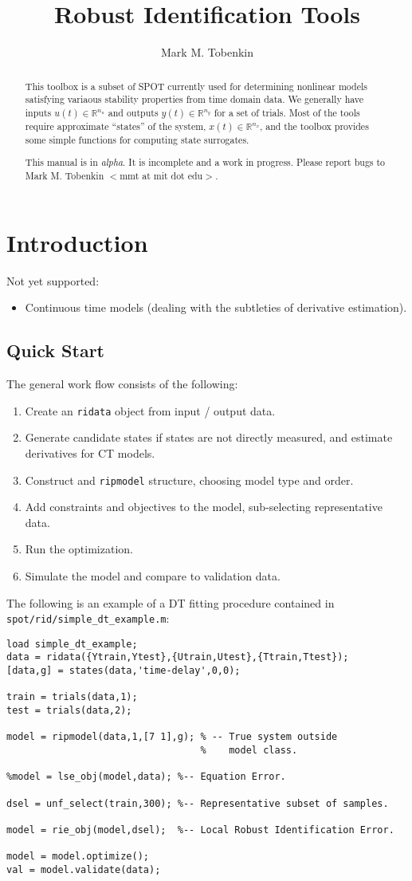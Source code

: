 \documentclass{article}
\title{Robust Identification Tools}
\author{Mark M. Tobenkin}
\newcommand{\RR}{\mathbb{R}}
\begin{document}
\begin{abstract}
This toolbox is a subset of SPOT currently
used for determining nonlinear models satisfying variaous stability
properties from time domain data.  We generally have inputs $u(t) \in
\RR^{n_u}$ and outputs $y(t) \in \RR^{n_y}$ for a set of trials.  Most
of the tools require approximate ``states'' of the system, $x(t) \in
\RR^{n_x}$, and the toolbox provides some simple functions for
computing state surrogates.

This manual is in {\it alpha}.  It is incomplete and a work in
progress.  Please report bugs to Mark M. Tobenkin $<$mmt at mit dot edu$>$.
\end{abstract}
\section{Introduction}
Not yet supported:
\begin{itemize}
  \item Continuous time models (dealing with the subtleties of
    derivative estimation).
\end{itemize}



\subsection{Quick Start}
The general work flow consists of the following:
\begin{enumerate}
\item Create an {\tt ridata} object from input / output data.
\item Generate candidate states if states are not directly measured, and estimate derivatives for CT models.
\item Construct and {\tt ripmodel} structure, choosing model type and order.
\item Add constraints and objectives to the model, sub-selecting representative data.
\item Run the optimization.
\item Simulate the model and compare to validation data.
\end{enumerate}
The following is an example of a DT fitting procedure contained in
{\tt spot/rid/simple\_dt\_example.m}:
\begin{verbatim}
load simple_dt_example;
data = ridata({Ytrain,Ytest},{Utrain,Utest},{Ttrain,Ttest});
[data,g] = states(data,'time-delay',0,0);

train = trials(data,1);
test = trials(data,2);

model = ripmodel(data,1,[7 1],g); % -- True system outside
                                  %    model class.

%model = lse_obj(model,data); %-- Equation Error.

dsel = unf_select(train,300); %-- Representative subset of samples.

model = rie_obj(model,dsel);  %-- Local Robust Identification Error.

model = model.optimize();
val = model.validate(data);
\end{verbatim}
\end{document}
